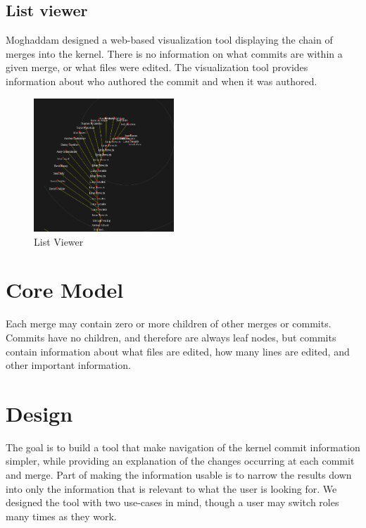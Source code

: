 \documentclass[conference, draftclsnofoot]{IEEEtran}
\begin{document}
\subsection{List viewer}
Moghaddam designed a web-based visualization tool displaying the chain of
merges into the kernel. There is no information on what commits are within a
given merge, or what files were edited. The visualization tool provides
information about who authored the commit and when it was authored.

\begin{figure}[h!]
	\centering
	\includegraphics[width=0.47\textwidth]{figures/gitvis.png}
	\caption{List Viewer}
	\label{fig:listviewer}
\end{figure}


\section{Core Model}
Each merge may contain zero or more children of other merges or commits.
Commits have no children, and therefore are always leaf nodes, but commits
contain information about what files are edited, how many lines are edited, and
other important information.

\section{Design}

The goal is to build a tool that make navigation of the kernel commit
information simpler, while providing an explanation of the changes occurring at
each commit and merge. Part of making the information usable is to narrow the
results down into only the information that is relevant to what the user is
looking for. We designed the tool with two use-cases in mind, though a user may
switch roles many times as they work.
\end{document}
